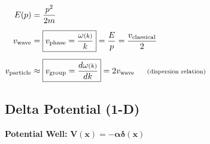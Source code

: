 \documentclass[12pt]{article}
\begin{document}
\vspace{10pt} \noindent
\( \begin{aligned}
    E(p) &= \frac{p^2}{2m}\\[5pt]
    v_\text{wave} &= \boxed{ v_\text{phase} = \frac{ \omega{\scriptstyle(k)} }{k} } 
        = \frac{E}{p} = \frac{v_\text{classical}}{2} \\[5pt]
    v_\text{particle} &\approx \boxed{ v_\text{group} = \frac{d \omega{\scriptstyle(k)} }{d k} } = 2 v_\text{wave}
        \indent \text{\scriptsize (dispersion relation)}
\end{aligned} \)

\vspace{10pt}
\subsection{Delta Potential (1-D)}

\vspace{15pt}
\textbf{Potential Well:} \indent \indent \indent 
    \( \boldsymbol{ V(x) = - \alpha \delta(x) } \) 
    \indent{}
\end{document}
